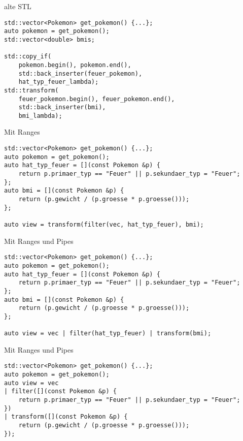 
\begin{frame}[fragile]{alte STL}
    \begin{verbatim}
std::vector<Pokemon> get_pokemon() {...};
auto pokemon = get_pokemon();
std::vector<double> bmis;

std::copy_if(
    pokemon.begin(), pokemon.end(),
    std::back_inserter(feuer_pokemon),
    hat_typ_feuer_lambda);
std::transform(
    feuer_pokemon.begin(), feuer_pokemon.end(),
    std::back_inserter(bmi),
    bmi_lambda);
    \end{verbatim}
\end{frame}

\begin{frame}[fragile]{Mit Ranges}
    \begin{verbatim}
std::vector<Pokemon> get_pokemon() {...};
auto pokemon = get_pokemon();
auto hat_typ_feuer = [](const Pokemon &p) {
    return p.primaer_typ == "Feuer" || p.sekundaer_typ = "Feuer";
};
auto bmi = [](const Pokemon &p) {
    return (p.gewicht / (p.groesse * p.groesse()));
};

auto view = transform(filter(vec, hat_typ_feuer), bmi);

\end{verbatim}
\end{frame}

\begin{frame}[fragile]{Mit Ranges und Pipes}
    \begin{verbatim}
std::vector<Pokemon> get_pokemon() {...};
auto pokemon = get_pokemon();
auto hat_typ_feuer = [](const Pokemon &p) {
    return p.primaer_typ == "Feuer" || p.sekundaer_typ = "Feuer";
};
auto bmi = [](const Pokemon &p) {
    return (p.gewicht / (p.groesse * p.groesse()));
};

auto view = vec | filter(hat_typ_feuer) | transform(bmi);

    \end{verbatim}
\end{frame}

\begin{frame}[fragile]{Mit Ranges und Pipes}
    \begin{verbatim}
std::vector<Pokemon> get_pokemon() {...};
auto pokemon = get_pokemon();
auto view = vec
| filter([](const Pokemon &p) {
    return p.primaer_typ == "Feuer" || p.sekundaer_typ = "Feuer";
})
| transform([](const Pokemon &p) {
    return (p.gewicht / (p.groesse * p.groesse()));
});

    \end{verbatim}
\end{frame}

